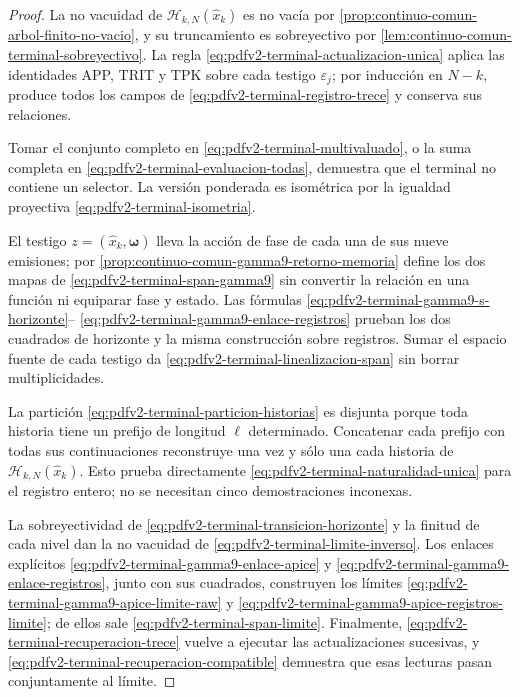\begin{proof}
La no vacuidad de
\(\mathscr H_{k,N}(\widehat x_k)\) es no vac\'ia por
\cref{prop:continuo-comun-arbol-finito-no-vacio}, y su truncamiento es
sobreyectivo por \cref{lem:continuo-comun-terminal-sobreyectivo}. La regla
\eqref{eq:pdfv2-terminal-actualizacion-unica} aplica las identidades APP,
TRIT y TPK sobre cada testigo \(\varepsilon_j\); por inducci\'on en
\(N-k\), produce todos los campos de
\eqref{eq:pdfv2-terminal-registro-trece} y conserva sus relaciones.

Tomar el conjunto completo en
\eqref{eq:pdfv2-terminal-multivaluado}, o la suma completa en
\eqref{eq:pdfv2-terminal-evaluacion-todas}, demuestra que el terminal no
contiene un selector. La versi\'on ponderada es isom\'etrica por la igualdad
proyectiva \eqref{eq:pdfv2-terminal-isometria}.

El testigo \(z=(\widehat x_k,\boldsymbol\omega)\) lleva la acción de fase de cada una
de sus nueve emisiones; por
\cref{prop:continuo-comun-gamma9-retorno-memoria} define los dos mapas de
\eqref{eq:pdfv2-terminal-span-gamma9} sin convertir la relación en una
función ni equiparar fase y estado. Las fórmulas
\eqref{eq:pdfv2-terminal-gamma9-s-horizonte}--
\eqref{eq:pdfv2-terminal-gamma9-enlace-registros} prueban los dos cuadrados
de horizonte y la misma construcción sobre registros. Sumar el espacio
fuente de cada testigo da
\eqref{eq:pdfv2-terminal-linealizacion-span} sin borrar multiplicidades.

La partici\'on
\eqref{eq:pdfv2-terminal-particion-historias} es disjunta porque toda
historia tiene un prefijo de longitud \(\ell\) determinado. Concatenar cada
prefijo con todas sus continuaciones reconstruye una vez y s\'olo una cada
historia de \(\mathscr H_{k,N}(\widehat x_k)\). Esto prueba directamente
\eqref{eq:pdfv2-terminal-naturalidad-unica} para el registro entero; no se
necesitan cinco demostraciones inconexas.

La sobreyectividad de
\eqref{eq:pdfv2-terminal-transicion-horizonte} y la finitud de cada nivel
dan la no vacuidad de
\eqref{eq:pdfv2-terminal-limite-inverso}. Los enlaces explícitos
\eqref{eq:pdfv2-terminal-gamma9-enlace-apice} y
\eqref{eq:pdfv2-terminal-gamma9-enlace-registros}, junto con sus cuadrados,
construyen los límites
\eqref{eq:pdfv2-terminal-gamma9-apice-limite-raw} y
\eqref{eq:pdfv2-terminal-gamma9-apice-registros-limite}; de ellos sale
\eqref{eq:pdfv2-terminal-span-limite}. Finalmente,
\eqref{eq:pdfv2-terminal-recuperacion-trece} vuelve a ejecutar las
actualizaciones sucesivas, y
\eqref{eq:pdfv2-terminal-recuperacion-compatible} demuestra que esas
lecturas pasan conjuntamente al l\'imite.
\end{proof}

